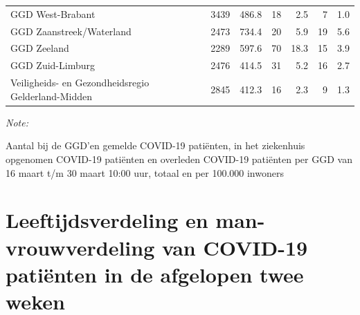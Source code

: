 \documentclass[
  english,
  man,floatsintext]{apa6}
\begin{document}
\begin{table}
\begin{threeparttable}
\begin{tabular}{lrrrrrr}
GGD West-Brabant & 3439 & 486.8 & 18 & 2.5 & 7 & 1.0\\
GGD Zaanstreek/Waterland & 2473 & 734.4 & 20 & 5.9 & 19 & 5.6\\
GGD Zeeland & 2289 & 597.6 & 70 & 18.3 & 15 & 3.9\\
GGD Zuid-Limburg & 2476 & 414.5 & 31 & 5.2 & 16 & 2.7\\
Veiligheids- en Gezondheidsregio Gelderland-Midden & 2845 & 412.3 & 16 & 2.3 & 9 & 1.3\\
\bottomrule
\end{tabular}
\begin{tablenotes}
\item \textit{Note: } 
\item Aantal bij de GGD’en gemelde COVID-19 patiënten, in het ziekenhuis opgenomen COVID-19 patiënten en overleden COVID-19 patiënten per GGD van 16 maart t/m 30 maart 10:00 uur, totaal en per 100.000 inwoners
\end{tablenotes}
\end{threeparttable}
\endgroup{}
\end{table}

\newpage

\hypertarget{leeftijdsverdeling-en-man-vrouwverdeling-van-covid-19-patiuxebnten-in-de-afgelopen-twee-weken}{%
\section{Leeftijdsverdeling en man-vrouwverdeling van COVID-19 patiënten in de afgelopen twee weken}\label{leeftijdsverdeling-en-man-vrouwverdeling-van-covid-19-patiuxebnten-in-de-afgelopen-twee-weken}}
\end{document}
